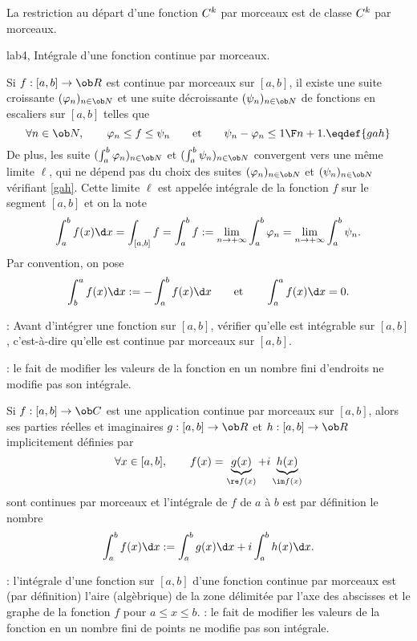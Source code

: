 %

\Propriete [$k\in\overline{\ob N}$]
La restriction au d\'epart d'une fonction $\sc C^k$ par morceaux est de classe $\sc C^k$ par morceaux. 

\Section lab4, Int\'egrale d'une fonction continue par morceaux. 

\Definition[$a< b$] 
Si $f:[a,b]\to\ob R$ est continue par morceaux sur $[a,b]$, il existe une suite croissante $(\varphi_n)_{n\in\ob N}$ et une suite d\'ecroissante $(\psi_n)_{n\in\ob N}$ de fonctions en escaliers sur $[a,b]$ telles que 
$$
\forall n\in\ob N, \qquad \varphi_n\le f\le \psi_n\qquad\mbox{et}\qquad \psi_n-\varphi_n\le {1\F n+1}.\eqdef{gah}
$$
De plus, les suite $(\int_a^b\varphi_n)_{n\in\ob N}$ et $(\int_a^b\psi_n)_{n\in\ob N}$ convergent vers une m\^eme limite $\ell$, qui ne d\'epend pas du choix des suites $(\varphi_n)_{n\in\ob N}$ et $(\psi_n)_{n\in\ob N}$ v\'erifiant \eqref{gah}. \pn
Cette limite $\ell$ est appel\'ee int\'egrale de la fonction $f$ sur le segment $[a,b]$ et on la note
$$
\int_a^bf(x)\d x=\int_{[a,b]}f= \int_a^bf:=\lim_{n\to+\infty}\int_a^b\varphi_n=\lim_{n\to+\infty}\int_a^b\psi_n.
$$
Par convention, on pose 
$$
\int_b^af(x)\d x:=-\int_a^bf(x)\d x\qquad \mbox{et}\qquad \int_a^af(x)\d x=0.
$$

\Remarque: Avant d'int\'egrer une fonction sur $[a,b]$, v\'erifier qu'elle est int\'egrable sur $[a,b]$, c'est-\`a-dire qu'elle est continue par morceaux sur $[a,b]$. 
\bigskip

\Remarque : le fait de modifier les valeurs de la fonction en un nombre fini d'endroits ne modifie pas son int\'egrale. 
\bigskip

\Definition [$a<b$] 
Si $f:[a,b]\to\ob C$ est une application continue par morceaux sur $[a,b]$, alors ses parties r\'eelles et imaginaires $g:[a,b]\to\ob R$ et $h:[a,b]\to\ob R$ implicitement d\'efinies par 
$$
\forall x\in[a,b], \qquad f(x)=\underbrace{g(x)}_{\re f(x)}+i\underbrace{h(x)}_{\im f(x)}
$$
sont continues par morceaux et l'int\'egrale de $f$ de $a$ \`a $b$ est par d\'efinition le nombre 
$$
\int_a^bf(x)\d x:=\int_a^bg(x)\d x+i\int_a^bh(x)\d x.
$$

\Remarque : l'int\'egrale d'une fonction sur $[a,b]$ d'une fonction continue par morceaux est (par d\'efinition) l'aire (alg\`ebrique) de la zone d\'elimit\'ee par l'axe des abscisses et le graphe de la fonction $f$ pour $a\le x\le b$. 
\bigskip
\Remarque  : le fait de modifier les valeurs de la fonction en un nombre fini de points ne modifie pas son int\'egrale. 
\bigskip

